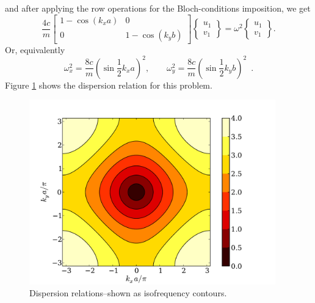 \documentclass[12pt,letterpaper]{article}
\begin{document}
and after applying the row operations for the Bloch-conditions imposition, we get
\begin{equation}
\frac{4c}{m}\begin{bmatrix}
1 - \cos(k_x a) & 0 \\ 
0 & 1-\cos(k_y b)
\end{bmatrix} \begin{Bmatrix}
u_1 \\ 
v_1 
\end{Bmatrix} = \omega^2 \begin{Bmatrix}
u_1 \\ 
v_1 
\end{Bmatrix} .
\end{equation}
Or, equivalently
\begin{equation}
\omega_x^2 = \frac{8c}{m}\left( \sin \frac{1}{2}k_x a\right)^2,\qquad \omega_y^2 = \frac{8c}{m}\left( \sin \frac{1}{2}k_y b \right)^2 \enspace .
\end{equation}
Figure \ref{fig:square-disp} shows the dispersion relation for this problem.
\begin{figure}[h]
\centering
\includegraphics[height=8cm]{img/square-disp.pdf} 
\caption{Dispersion relations--shown as isofrequency contours.}\label{fig:square-disp}
\end{figure}
\end{document}
